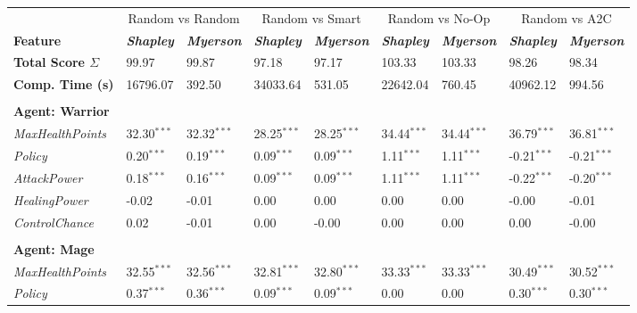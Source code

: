 \begin{tabular}{lllllllll}
&\multicolumn{2}{c}{Random vs Random}&\multicolumn{2}{c}{Random vs Smart}&\multicolumn{2}{c}{Random vs No-Op}&\multicolumn{2}{c}{Random vs A2C}\\
\textbf{Feature}         & \textit{\textbf{Shapley}} & \textit{\textbf{Myerson}}& \textit{\textbf{Shapley}} & \textit{\textbf{Myerson}}& \textit{\textbf{Shapley}} & \textit{\textbf{Myerson}}& \textit{\textbf{Shapley}} & \textit{\textbf{Myerson}} \\
\textbf{Total Score $\Sigma$} & 99.97&99.87&97.18&97.17&103.33&103.33&98.26&98.34 \\\n\textbf{Comp. Time (s)} & 16796.07&392.50&34033.64&531.05&22642.04&760.45&40962.12&994.56 \\\n\hline
&                           & & & & &                          & &\\
\textbf{Agent: Warrior }        &                           &                           & &\\
\textit{MaxHealthPoints} & 32.30${}^{***}$                   & 32.32${}^{***}$ & 28.25${}^{***}$ &  28.25${}^{***}$ & 34.44${}^{***}$  & 34.44${}^{***}$ & 36.79${}^{***}$  & 36.81${}^{***}$                \\
\textit{Policy}     & 0.20${}^{***}$                    & 0.19${}^{***}$      & 0.09${}^{***}$ &   0.09${}^{***}$ & 1.11${}^{***}$ & 1.11${}^{***}$ & -0.21${}^{***}$  & -0.21${}^{***}$         \\
\textit{AttackPower}     & 0.18${}^{***}$                    & 0.16${}^{***}$      & 0.09${}^{***}$ &   0.09${}^{***}$ & 1.11${}^{***}$ & 1.11${}^{***}$ & -0.22${}^{***}$  & -0.20${}^{***}$         \\
\textit{HealingPower}    & -0.02                   & -0.01     & 0.00  & 0.00 & 0.00 & 0.00 & -0.00  & -0.01        \\
\textit{ControlChance}   & 0.02                   & -0.01    & 0.00    & -0.00 & 0.00   & 0.00 & 0.00  & -0.00        \\
&                           & & & & &                          & &\\
\textbf{Agent: Mage }        &                           &                           & &\\
\textit{MaxHealthPoints} & 32.55${}^{***}$                   & 32.56${}^{***}$ & 32.81${}^{***}$ &  32.80${}^{***}$ & 33.33${}^{***}$  & 33.33${}^{***}$ & 30.49${}^{***}$  & 30.52${}^{***}$                \\
\textit{Policy}     & 0.37${}^{***}$                    & 0.36${}^{***}$      & 0.09${}^{***}$ &   0.09${}^{***}$ & 0.00 & 0.00 & 0.30${}^{***}$  & 0.30${}^{***}$         \\

\end{tabular}
